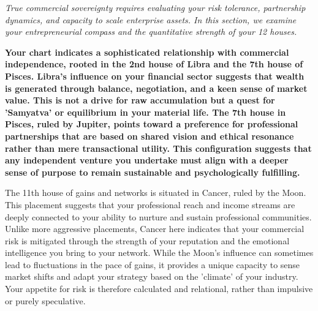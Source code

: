 


{\fontsize{9.5}{14}\selectfont\color{DeepSlate}\itshape True commercial sovereignty requires evaluating your risk tolerance, partnership dynamics, and capacity to scale enterprise assets. In this section, we examine your entrepreneurial compass and the quantitative strength of your 12 houses.}\par\vspace{3.5mm}

\label{topic49}

{\fontsize{9.5}{13.8}\selectfont\bfseries\color{DeepSlate} Your chart indicates a sophisticated relationship with commercial independence, rooted in the 2nd house of Libra and the 7th house of Pisces. Libra's influence on your financial sector suggests that wealth is generated through balance, negotiation, and a keen sense of market value. This is not a drive for raw accumulation but a quest for 'Samyatva' or equilibrium in your material life. The 7th house in Pisces, ruled by Jupiter, points toward a preference for professional partnerships that are based on shared vision and ethical resonance rather than mere transactional utility. This configuration suggests that any independent venture you undertake must align with a deeper sense of purpose to remain sustainable and psychologically fulfilling.}\par\vspace{2mm}

{\fontsize{9}{13}\selectfont The 11th house of gains and networks is situated in Cancer, ruled by the Moon. This placement suggests that your professional reach and income streams are deeply connected to your ability to nurture and sustain professional communities. Unlike more aggressive placements, Cancer here indicates that your commercial risk is mitigated through the strength of your reputation and the emotional intelligence you bring to your network. While the Moon's influence can sometimes lead to fluctuations in the pace of gains, it provides a unique capacity to sense market shifts and adapt your strategy based on the 'climate' of your industry. Your appetite for risk is therefore calculated and relational, rather than impulsive or purely speculative.}\par\vspace{1.8mm}

